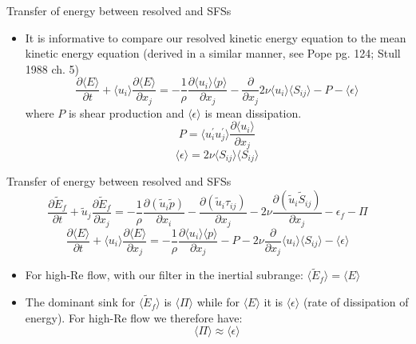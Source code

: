 
\begin{frame}{Transfer of energy between resolved and SFSs}

\begin{itemize}
	\item It is informative to compare our resolved kinetic energy equation to the mean kinetic energy equation (derived in a similar manner, see Pope pg. 124; Stull 1988 ch. 5)
	$$\frac{\partial \langle E\rangle}{\partial t} + \langle u_i\rangle \frac{\partial \langle E \rangle}{\partial x_j} = -\frac{1}{\rho} \frac{\partial \langle u_i\rangle \langle p \rangle}{\partial x_j} - \frac{\partial}{\partial x_j} 2\nu\langle u_i\rangle \langle S_{ij}\rangle -P - \langle \epsilon \rangle$$
	where $P$ is shear production and $\langle \epsilon \rangle$ is mean dissipation.
	$$P = \langle u_i^\prime u_j^\prime \rangle \frac{\partial \langle u_i\rangle}{\partial x_j}$$
	$$\langle \epsilon \rangle = 2\nu\langle S_{ij}\rangle \langle S_{ij}\rangle$$
\end{itemize}
\end{frame}


\begin{frame}{Transfer of energy between resolved and SFSs}
	$$\frac{\partial \tilde E_f}{\partial t} + \tilde u_j\frac{\partial \tilde E_f}{\partial x_j} = -\frac{1}{\rho} \frac{\partial (\tilde u_i \tilde p)}{\partial x_i} - \frac{\partial (\tilde u_i \tau_{ij})}{\partial x_j} - 2\nu\frac{\partial (\tilde u_i \tilde S_{ij})}{\partial x_j}- \epsilon_f -\Pi$$
	$$\frac{\partial \langle E\rangle}{\partial t} + \langle u_i\rangle \frac{\partial \langle E \rangle}{\partial x_j} = -\frac{1}{\rho} \frac{\partial \langle u_i\rangle \langle p \rangle}{\partial x_j} -P - 2\nu\frac{\partial}{\partial x_j} \langle u_i\rangle \langle S_{ij}\rangle - \langle \epsilon \rangle$$
\begin{itemize}
	\item For high-Re flow, with our filter in the inertial subrange: $\langle \tilde E_f \rangle = \langle E \rangle$
	\item The dominant sink for $\langle \tilde E_f \rangle$ is $\langle \Pi \rangle$ while for $\langle E \rangle$ it is $\langle \epsilon \rangle$ (rate of dissipation of energy). For high-Re flow we therefore have:
	$$\langle \Pi \rangle \approx \langle \epsilon \rangle$$
\end{itemize}
\end{frame}

